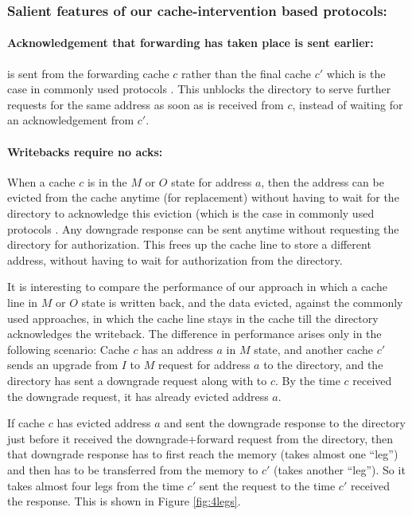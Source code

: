 \subsubsection{Salient features of our cache-intervention based protocols:}

\noindent \paragraph{Acknowledgement that forwarding has taken place is sent
earlier:} \FwdAck{} is sent from the forwarding cache $c$ rather than the final
cache $c'$ which is the case in commonly used protocols \cite{hammer, gems}.
This unblocks the directory to serve further requests for the same address as
soon as \FwdAck{} is received from $c$, instead of waiting for an
acknowledgement from $c'$.

\noindent \paragraph{Writebacks require no acks:} When a cache $c$ is in the $M$
or $O$ state for address $a$, then the address can be evicted from the cache
anytime (for replacement) without having to wait for the directory to
acknowledge this eviction (which is the case in commonly used protocols
\cite{hammer, gems}. Any downgrade response can be sent anytime without
requesting the directory for authorization. This frees up the cache line to
store a different address, without having to wait for authorization from the
directory.

It is interesting to compare the performance of our approach in which a cache
line in $M$ or $O$ state is written back, and the data evicted, against the
commonly used approaches, in which the cache line stays in the cache till the
directory acknowledges the writeback. The difference in performance arises only
in the following scenario: Cache $c$ has an address $a$ in $M$ state, and
another cache $c'$ sends an upgrade from $I$ to $M$ request for address $a$ to
the directory, and the directory has sent a downgrade request along with
 to $c$. By the time $c$ received the downgrade request, it has
already evicted address $a$.

If cache $c$ has evicted address $a$ and sent the downgrade response to the
directory just before it received the downgrade+forward request from the
directory, then that downgrade response has to first reach the memory (takes
almost one ``leg'') and then has to be transferred from the memory to $c'$
(takes another ``leg''). So it takes almost four legs from the time $c'$ sent
the request to the time $c'$ received the response. This is shown in Figure
\ref{fig:4legs}.

